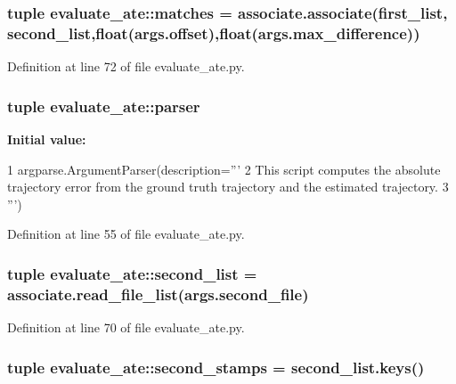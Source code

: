 \subsubsection[{matches}]{\setlength{\rightskip}{0pt plus 5cm}tuple {\bf evaluate\-\_\-ate\-::matches} = {\bf associate.\-associate}({\bf first\-\_\-list}, {\bf second\-\_\-list},float(args.\-offset),float(args.\-max\-\_\-difference))}\label{namespaceevaluate__ate_a8abec59b0a13ae62dcd1bf69aa8d1817}


\-Definition at line 72 of file evaluate\-\_\-ate.\-py.

\subsubsection[{parser}]{\setlength{\rightskip}{0pt plus 5cm}tuple {\bf evaluate\-\_\-ate\-::parser}}\label{namespaceevaluate__ate_ab3abe602c35db92d713f272abb2a5112}
{\bfseries \-Initial value\-:}
\begin{DoxyCode}
1 argparse.ArgumentParser(description='''
2     This script computes the absolute trajectory error from the ground truth
       trajectory and the estimated trajectory. 
3     ''')
\end{DoxyCode}


\-Definition at line 55 of file evaluate\-\_\-ate.\-py.

\subsubsection[{second\-\_\-list}]{\setlength{\rightskip}{0pt plus 5cm}tuple {\bf evaluate\-\_\-ate\-::second\-\_\-list} = {\bf associate.\-read\-\_\-file\-\_\-list}(args.\-second\-\_\-file)}\label{namespaceevaluate__ate_a0a642c69e81739470ed6c06b1c6946a7}


\-Definition at line 70 of file evaluate\-\_\-ate.\-py.

\subsubsection[{second\-\_\-stamps}]{\setlength{\rightskip}{0pt plus 5cm}tuple {\bf evaluate\-\_\-ate\-::second\-\_\-stamps} = second\-\_\-list.\-keys()}\label{namespaceevaluate__ate_a9328afffda3037f7146b7b2e496f8772}


